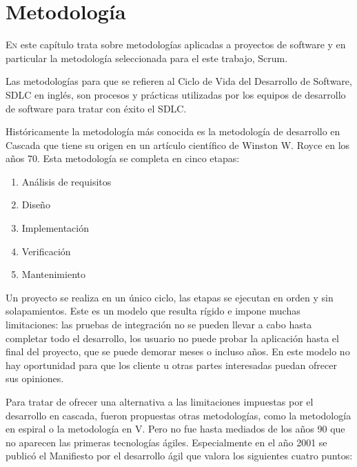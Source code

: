 

\chapter{Metodología}
\label{chap:metodologia}

\lettrine{E}{n} este capítulo trata sobre metodologías aplicadas a proyectos de software y en particular la metodología seleccionada para el este trabajo, Scrum.

Las metodologías para que se refieren al Ciclo de Vida del Desarrollo de Software, SDLC en inglés, son procesos y prácticas utilizadas por los equipos de desarrollo de software para tratar con éxito el SDLC.

Históricamente la metodología más conocida es la metodología de desarrollo en Cascada que tiene su origen en un artículo científico de Winston W. Royce en los años 70. Esta metodología se completa en cinco etapas:

\begin{enumerate}
    \item Análisis de requisitos
    \item Diseño
    \item Implementación
    \item Verificación
    \item Mantenimiento
\end{enumerate}

Un proyecto se realiza en un único ciclo,  las etapas se ejecutan en orden y sin solapamientos. Este es un modelo que resulta rígido e impone muchas limitaciones: las pruebas de integración no se pueden llevar a cabo hasta completar todo el desarrollo, los usuario no puede probar la aplicación hasta el final del proyecto, que se puede demorar meses o incluso años. En este modelo no hay oportunidad para que los cliente u otras partes interesadas puedan ofrecer sus opiniones.

Para tratar de ofrecer una alternativa a las limitaciones impuestas por el desarrollo en cascada, fueron propuestas otras metodologías, como la metodología en espiral o la metodología en V. Pero no fue hasta mediados de los años 90 que no aparecen las primeras tecnologías ágiles. Especialmente en el año 2001 se publicó el Manifiesto por el desarrollo ágil que valora los siguientes cuatro puntos:

